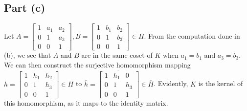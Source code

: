 \documentclass{article}
\begin{document}
\subsection*{Part (c)}
Let $A = \begin{bmatrix} 1 & a_1 & a_2 \\ 0 & 1 & a_3 \\ 0 & 0 & 1\end{bmatrix}, B = \begin{bmatrix} 1 & b_1 & b_2 \\ 0 & 1 & b_3 \\ 0 & 0 & 1\end{bmatrix} \in H$. From the computation done in (b), we see that $A$ and $B$ are in the same coset of $K$ when $a_1 = b_1$ and $a_3 = b_3$. We can then construct the surjective homomorphism mapping $h = \begin{bmatrix} 1 & h_1 & h_2 \\ 0 & 1 & h_3 \\ 0 & 0 & 1\end{bmatrix} \in H$ to $\overline{h} = \overline{\begin{bmatrix} 1 & h_1 & 0 \\ 0 & 1 & h_3 \\ 0 & 0 & 1\end{bmatrix}} \in \overline{H}$. Evidently, $K$ is the kernel of this homomorphism, as it maps to the identity matrix.

\clearpage

\problem
\end{document}
